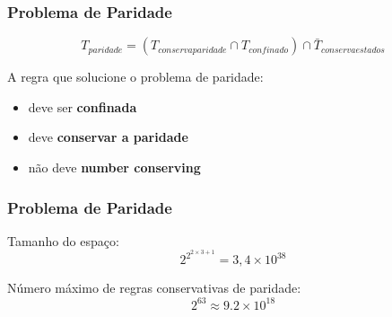 \documentclass[aspectratio=43,hyperref={pdfpagelabels=false}]{beamer}
\begin{document}
\begin{frame}
    \frametitle{Problema de Paridade}
    \begin{equation}
    T_{paridade} = (T_{conservaparidade} \cap T_{confinado}) \cap \bar{T}_{conservaestados}
    \label{eq:operationsTemplateParidade}
    \end{equation}

    \begin{alertblock}{A regra que solucione o problema de paridade:}
        \vspace{-0.4cm}    
        \begin{itemize}
          \item deve ser \textbf{confinada}
          \item deve \textbf{conservar a paridade}
          \item não deve \textbf{number conserving}
        \end{itemize}
    \end{alertblock}
\end{frame}

\begin{frame}
    \frametitle{Problema de Paridade}

    Tamanho do espaço:
    \begin{equation}
    2^{2^{2\times3+1}}=3,4 \times 10^{38}
    \end{equation}

    Número máximo de regras conservativas de paridade:
    \begin{equation}
    2^{63} \approx  9.2\times 10^{18}
    \end{equation}
\end{frame}
\end{document}

